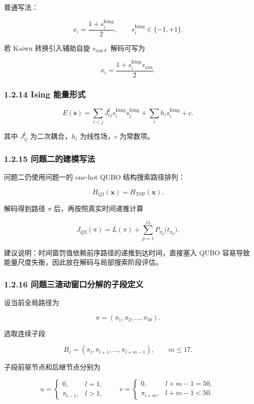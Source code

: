 \documentclass[
  a4paper,
]{ctexart}
\begin{document}
普通写法：

\[
x_i=\frac{1+s_i^{\mathrm{Ising}}}{2},\qquad s_i^{\mathrm{Ising}}\in\{-1,+1\}.
\]

若 Kaiwu 转换引入辅助自旋 \(s_{\mathrm{aux}}\)，解码可写为

\[
x_i=\frac{1+s_i^{\mathrm{Ising}}s_{\mathrm{aux}}}{2}.
\]

\subsubsection{1.2.14 Ising
能量形式}\label{ising-ux80fdux91cfux5f62ux5f0f}

\[
E(\mathbf{s})=\sum_{i<j}J_{ij}^{\mathrm{I}}s_i^{\mathrm{Ising}}s_j^{\mathrm{Ising}}+\sum_i h_is_i^{\mathrm{Ising}}+c.
\]

其中 \(J_{ij}^{\mathrm{I}}\) 为二次耦合，\(h_i\) 为线性场，\(c\)
为常数项。

\subsubsection{1.2.15
问题二的建模写法}\label{ux95eeux9898ux4e8cux7684ux5efaux6a21ux5199ux6cd5}

问题二仍使用问题一的 one-hot QUBO 结构搜索路径排列：

\[
H_{Q2}(\mathbf{x})=H_{\mathrm{TSP}}(\mathbf{x}).
\]

解码得到路径 \(\pi\) 后，再按照真实时间递推计算

\[
J_{Q2}(\pi)=L(\pi)+\sum_{p=1}^{15}P_{\pi_p}\bigl(t_{\pi_p}\bigr).
\]

建议说明：时间窗罚值依赖前序路径的递推到达时间，直接塞入 QUBO
容易导致能量尺度失衡，因此放在解码与局部搜索阶段评估。

\subsubsection{1.2.16
问题三滚动窗口分解的子段定义}\label{ux95eeux9898ux4e09ux6edaux52a8ux7a97ux53e3ux5206ux89e3ux7684ux5b50ux6bb5ux5b9aux4e49}

设当前全局路径为

\[
\pi=(\pi_1,\pi_2,\ldots,\pi_{50}).
\]

选取连续子段

\[
B_r=(\pi_l,\pi_{l+1},\ldots,\pi_{l+m-1}),\qquad m\le 17.
\]

子段前驱节点和后继节点分别为

\[
u=\begin{cases}
0, & l=1,\\
\pi_{l-1}, & l>1,
\end{cases}
\qquad
v=\begin{cases}
0, & l+m-1=50,\\
\pi_{l+m}, & l+m-1<50.
\end{cases}
\]
\end{document}

